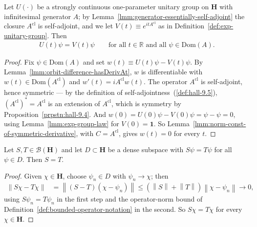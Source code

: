 \begin{lemma}
    \label{lmm:orbits-agree-on-domain}
    \leanok
    Let $U(\cdot)$ be a strongly continuous one-parameter unitary group on $\mathbf{H}$ with infinitesimal generator $A$; by Lemma~\ref{lmm:generator-essentially-self-adjoint} the closure $A^{\text{cl}}$ is self-adjoint, and we let $V(t) \equiv e^{itA^{\text{cl}}}$ as in Definition~\ref{def:exp-unitary-group}. Then
    \begin{align}
        U(t)\psi = V(t)\psi \qquad \text{for all } t \in \mathbb{R} \text{ and all } \psi \in \text{Dom}(A).
    \end{align}
\end{lemma}
\begin{proof}
    \leanok
Fix $\psi \in \text{Dom}(A)$ and set $w(t) \equiv U(t)\psi - V(t)\psi$. By Lemma~\ref{lmm:orbit-difference-hasDerivAt}, $w$ is differentiable with $w(t) \in \text{Dom}(A^{\text{cl}})$ and $w'(t) = iA^{\text{cl}}w(t)$. The operator $A^{\text{cl}}$ is self-adjoint, hence symmetric — by the definition of self-adjointness~(\ref{def:hall-9.5}), $(A^{\text{cl}})^* = A^{\text{cl}}$ is an extension of $A^{\text{cl}}$, which is symmetry by Proposition~\ref{prpstn:hall-9.4}. And $w(0) = U(0)\psi - V(0)\psi = \psi - \psi = 0$, using Lemma~\ref{lmm:exp-group-law} for $V(0) = \mathbf{1}$. So Lemma~\ref{lmm:norm-const-of-symmetric-derivative}, with $C = A^{\text{cl}}$, gives $w(t) = 0$ for every $t$.
\end{proof}

\begin{lemma}
    \label{lmm:agree-on-dense-subspace}
    \leanok
    Let $S, T \in \mathcal{B}(\mathbf{H})$ and let $D \subset \mathbf{H}$ be a dense subspace with $S\psi = T\psi$ for all $\psi \in D$. Then $S = T$.
\end{lemma}
\begin{proof}
    \leanok
Given $\chi \in \mathbf{H}$, choose $\psi_n \in D$ with $\psi_n \to \chi$; then
\begin{align}
    \left\| S\chi - T\chi \right\| &= \left\| \left( S - T \right)(\chi - \psi_n) \right\| \le \left( \left\| S \right\| + \left\| T \right\| \right) \left\| \chi - \psi_n \right\| \longrightarrow 0,
\end{align}
using $S\psi_n = T\psi_n$ in the first step and the operator-norm bound of Definition~\ref{def:bounded-operator-notation} in the second. So $S\chi = T\chi$ for every $\chi \in \mathbf{H}$.
\end{proof}


